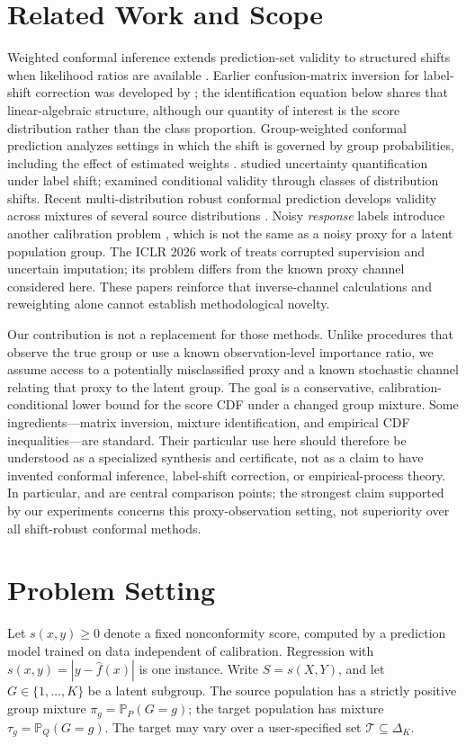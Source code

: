 \documentclass[twoside,11pt]{article}
\newcommand{\PR}{\mathbb{P}}
\begin{document}
\section{Related Work and Scope}
Weighted conformal inference extends prediction-set validity to structured shifts when likelihood ratios are available \citep{tibshirani2019}. Earlier confusion-matrix inversion for label-shift correction was developed by \citet{lipton2018}; the identification equation below shares that linear-algebraic structure, although our quantity of interest is the score distribution rather than the class proportion. Group-weighted conformal prediction analyzes settings in which the shift is governed by group probabilities, including the effect of estimated weights \citep{bhattacharyya2026}. \citet{podkopaev2021} studied uncertainty quantification under label shift; \citet{gibbs2025} examined conditional validity through classes of distribution shifts. Recent multi-distribution robust conformal prediction develops validity across mixtures of several source distributions \citep{yang2026}. Noisy \emph{response} labels introduce another calibration problem \citep{sesia2025}, which is not the same as a noisy proxy for a latent population group. The ICLR 2026 work of \citet{feldman2026} treats corrupted supervision and uncertain imputation; its problem differs from the known proxy channel considered here. These papers reinforce that inverse-channel calculations and reweighting alone cannot establish methodological novelty.

Our contribution is not a replacement for those methods. Unlike procedures that observe the true group or use a known observation-level importance ratio, we assume access to a potentially misclassified proxy and a known stochastic channel relating that proxy to the latent group. The goal is a conservative, calibration-conditional lower bound for the score CDF under a changed group mixture. Some ingredients---matrix inversion, mixture identification, and empirical CDF inequalities---are standard. Their particular use here should therefore be understood as a specialized synthesis and certificate, not as a claim to have invented conformal inference, label-shift correction, or empirical-process theory. In particular, \citet{bhattacharyya2026} and \citet{yang2026} are central comparison points; the strongest claim supported by our experiments concerns this proxy-observation setting, not superiority over all shift-robust conformal methods.

\section{Problem Setting}
Let $s(x,y)\geq0$ denote a fixed nonconformity score, computed by a prediction model trained on data independent of calibration. Regression with $s(x,y)=|y-\widehat f(x)|$ is one instance. Write $S=s(X,Y)$, and let $G\in\{1,\ldots,K\}$ be a latent subgroup. The source population has a strictly positive group mixture $\pi_g=\PR_P(G=g)$; the target population has mixture $\tau_g=\PR_Q(G=g)$. The target may vary over a user-specified set $\mathcal T\subseteq\Delta_K$.
\end{document}
